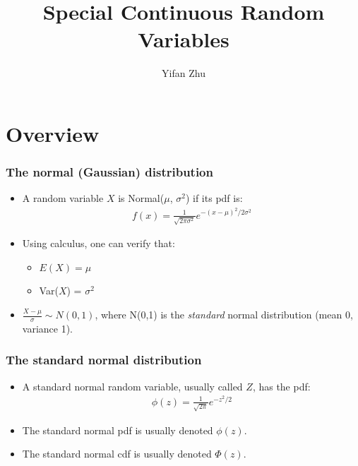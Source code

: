 \documentclass[handout]{beamer}\usepackage[]{graphicx}\usepackage[]{color}
\title{Special Continuous Random Variables}
\author{Yifan Zhu}
\date{}
\institute{Iowa State University}
\numberwithin{equation}{section}
\begin{document}
\begin{frame}
\titlepage
 \end{frame}
 

\section{Overview}

\begin{frame}
\frametitle{The normal (Gaussian) distribution}

\begin{itemize}
\item A random variable $X$ is Normal($\mu$, $\sigma^2$) if its pdf is:
\pause \begin{align*}
f(x) = \frac{1}{\sqrt{2 \pi \sigma^2}} e^{-(x-\mu)^2/2\sigma^2}
\end{align*}
\pause \item Using calculus, one can verify that:
\begin{itemize}
\pause \item $E(X) = \mu$
\pause \item Var($X$) = $\sigma^2$
\end{itemize}
\pause \item $\frac{X - \mu}{\sigma} \sim N(0,1)$, where N(0,1) is the \emph{standard} normal distribution (mean 0, variance 1). 
\end{itemize}
\end{frame}

\begin{frame}
\frametitle{The standard normal distribution}
\begin{itemize}
\item A standard normal random variable, usually called $Z$, has the pdf:
\pause \begin{align*}
\phi(z) = \frac{1}{\sqrt{2 \pi}} e^{-z^2/2}
\end{align*}
\pause \item The standard normal pdf is usually denoted $\phi(z)$. 
\pause \item The standard normal cdf is usually denoted $\Phi(z)$.
\end{itemize}
\end{frame}
\end{document}

